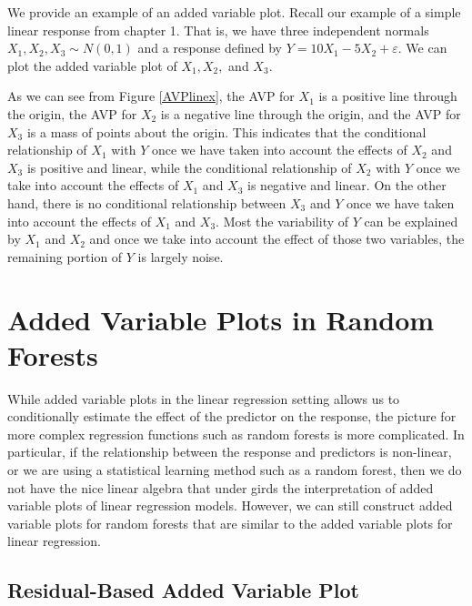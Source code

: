 \documentclass[12pt,twoside]{reedthesis}
\theoremstyle{definition}
\theoremstyle{definition}
\theoremstyle{definition}
\theoremstyle{remark}
\begin{document}
We provide an example of an added variable plot. Recall our example of a
simple linear response from chapter 1. That is, we have three
independent normals \(X_1,X_2,X_3\sim N(0,1)\) and a response defined by
\(Y=10X_1-5X_2+\varepsilon.\) We can plot the added variable plot of
\(X_1, X_2,\) and \(X_3\). \par

As we can see from Figure \ref{AVPlinex}, the AVP for \(X_1\) is a
positive line through the origin, the AVP for \(X_2\) is a negative line
through the origin, and the AVP for \(X_3\) is a mass of points about
the origin. This indicates that the conditional relationship of \(X_1\)
with \(Y\) once we have taken into account the effects of \(X_2\) and
\(X_3\) is positive and linear, while the conditional relationship of
\(X_2\) with \(Y\) once we take into account the effects of \(X_1\) and
\(X_3\) is negative and linear. On the other hand, there is no
conditional relationship between \(X_3\) and \(Y\) once we have taken
into account the effects of \(X_1\) and \(X_3\). Most the variability of
\(Y\) can be explained by \(X_1\) and \(X_2\) and once we take into
account the effect of those two variables, the remaining portion of
\(Y\) is largely noise. \par

\section{Added Variable Plots in Random
Forests}\label{added-variable-plots-in-random-forests}

While added variable plots in the linear regression setting allows us to
conditionally estimate the effect of the predictor on the response, the
picture for more complex regression functions such as random forests is
more complicated. In particular, if the relationship between the
response and predictors is non-linear, or we are using a statistical
learning method such as a random forest, then we do not have the nice
linear algebra that under girds the interpretation of added variable
plots of linear regression models. However, we can still construct added
variable plots for random forests that are similar to the added variable
plots for linear regression. \par

\subsection{Residual-Based Added Variable
Plot}\label{residual-based-added-variable-plot}
\end{document}
